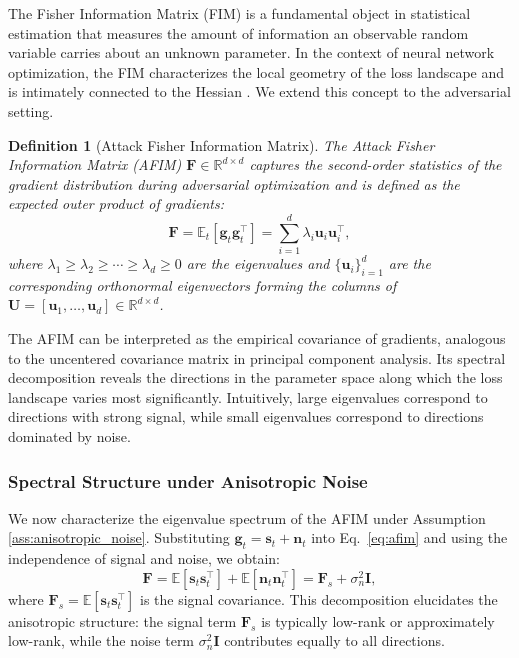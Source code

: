 ﻿\documentclass[lettersize,journal]{IEEEtran}
\newtheorem{definition}{Definition}
\begin{document}
The Fisher Information Matrix (FIM) is a fundamental object in statistical estimation that measures the amount of information an observable random variable carries about an unknown parameter. In the context of neural network optimization, the FIM characterizes the local geometry of the loss landscape and is intimately connected to the Hessian \cite{amari1998natural, martens2015optimizing}. We extend this concept to the adversarial setting.

\begin{definition}[Attack Fisher Information Matrix]
\label{def:afim}
The Attack Fisher Information Matrix (AFIM) $\mathbf{F} \in \mathbb{R}^{d \times d}$ captures the second-order statistics of the gradient distribution during adversarial optimization and is defined as the expected outer product of gradients:
\begin{equation}
\label{eq:afim}
\mathbf{F} = \mathbb{E}_{t}\left[ \mathbf{g}_t \mathbf{g}_t^\top \right] = \sum_{i=1}^{d} \lambda_i \mathbf{u}_i \mathbf{u}_i^\top,
\end{equation}
where $\lambda_1 \geq \lambda_2 \geq \cdots \geq \lambda_d \geq 0$ are the eigenvalues and $\{\mathbf{u}_i\}_{i=1}^{d}$ are the corresponding orthonormal eigenvectors forming the columns of $\mathbf{U} = [\mathbf{u}_1, \ldots, \mathbf{u}_d] \in \mathbb{R}^{d \times d}$.
\end{definition}

The AFIM can be interpreted as the empirical covariance of gradients, analogous to the uncentered covariance matrix in principal component analysis. Its spectral decomposition reveals the directions in the parameter space along which the loss landscape varies most significantly. Intuitively, large eigenvalues correspond to directions with strong signal, while small eigenvalues correspond to directions dominated by noise.

\subsubsection{Spectral Structure under Anisotropic Noise}

We now characterize the eigenvalue spectrum of the AFIM under Assumption \ref{ass:anisotropic_noise}. Substituting $\mathbf{g}_t = \mathbf{s}_t + \mathbf{n}_t$ into Eq.~\eqref{eq:afim} and using the independence of signal and noise, we obtain:
\begin{equation}
\label{eq:afim_decomposition}
\mathbf{F} = \mathbb{E}[\mathbf{s}_t \mathbf{s}_t^\top] + \mathbb{E}[\mathbf{n}_t \mathbf{n}_t^\top] = \mathbf{F}_s + \sigma_n^2 \mathbf{I},
\end{equation}
where $\mathbf{F}_s = \mathbb{E}[\mathbf{s}_t \mathbf{s}_t^\top]$ is the signal covariance. This decomposition elucidates the anisotropic structure: the signal term $\mathbf{F}_s$ is typically low-rank or approximately low-rank, while the noise term $\sigma_n^2 \mathbf{I}$ contributes equally to all directions.
\end{document}
